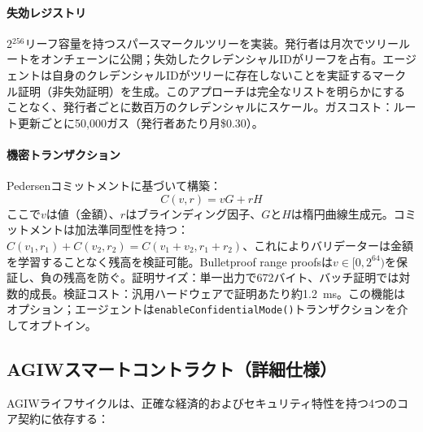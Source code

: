 \documentclass[11pt]{article}
\begin{document}
\paragraph{失効レジストリ} 2$^{256}$リーフ容量を持つスパースマークルツリーを実装。発行者は月次でツリールートをオンチェーンに公開；失効したクレデンシャルIDがリーフを占有。エージェントは自身のクレデンシャルIDがツリーに存在しないことを実証するマークル証明（非失効証明）を生成。このアプローチは完全なリストを明らかにすることなく、発行者ごとに数百万のクレデンシャルにスケール。ガスコスト：ルート更新ごとに50,000ガス（発行者あたり月\$0.30）。

\paragraph{機密トランザクション} Pedersenコミットメントに基づいて構築：
\begin{equation}
C(v, r) = vG + rH
\end{equation}
ここで$v$は値（金額）、$r$はブラインディング因子、$G$と$H$は楕円曲線生成元。コミットメントは加法準同型性を持つ：$C(v_1, r_1) + C(v_2, r_2) = C(v_1 + v_2, r_1 + r_2)$、これによりバリデーターは金額を学習することなく残高を検証可能。Bulletproof range proofsは$v \in [0, 2^{64})$を保証し、負の残高を防ぐ。証明サイズ：単一出力で672バイト、バッチ証明では対数的成長。検証コスト：汎用ハードウェアで証明あたり約1.2~ms。この機能はオプション；エージェントは\texttt{enableConfidentialMode()}トランザクションを介してオプトイン。

\subsection{AGIWスマートコントラクト（詳細仕様）}
\label{sec:agiw-contracts}
AGIWライフサイクルは、正確な経済的およびセキュリティ特性を持つ4つのコア契約に依存する：
\end{document}
